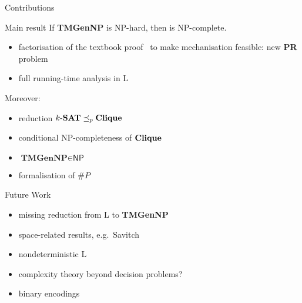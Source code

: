 \documentclass[11pt,usenames,dvipsnames,
hyperref={pdfencoding=auto,psdextra}]{beamer}
\makeatletter
\def\beamer@writeslidentry@miniframesoff{%
  \expandafter\beamer@ifempty\expandafter{\beamer@framestartpage}{}%
  {%
    \clearpage\beamer@notesactions%
  }
}
\newcommand*{\miniframesoff}{\let\beamer@writeslidentry=\beamer@writeslidentry@miniframesoff}
\newcommand*{\PR}{\textbf{PR}}
\newcommand*{\gennp}{\textbf{TMGenNP}}
\newcommand{\NP}{\textsf{NP}}
\newcommand{\redP}{\ensuremath{\preceq_p}}
\newcommand{\Clique}{\normalfont\textbf{Clique}}
\makeatother
\begin{document}
\begin{frame}{Contributions}
  \begin{block}{Main result}
    If \gennp{} is \NP{}-hard, then \SAT{} is \NP{}-complete. 
  \end{block}
  \begin{itemize}
    \item factorisation of the textbook proof~\cite{Sipser:TheoryofComputation} to make mechanisation feasible: new \PR{} problem
    \item full running-time analysis in L
  \end{itemize}

  Moreover: 
  \begin{itemize}
    \item reduction $\text{$k$-\SAT{}} \redP{} \Clique{}$
    \item conditional \NP{}-completeness of $\Clique{}$
    \item $\gennp{} \in \NP{}$
    \item formalisation of $\#P$
  \end{itemize}
\end{frame}

\begin{frame}{Future Work}
  \begin{itemize}
    \item missing reduction from L to \gennp{} 
    \item space-related results, e.g.\ Savitch
    \item nondeterministic L
    \item complexity theory beyond decision problems?
    \item binary encodings
  \end{itemize}
\end{frame}

\miniframesoff
\section{}
\end{document}
